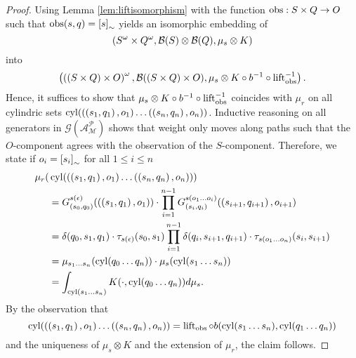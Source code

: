 \begin{proof}
  Using Lemma \ref{lem:liftisomorphism} with the function
  $\operatorname{obs}:S\times Q\rightarrow O$ such that $\operatorname{obs}(s, q) = \left[s\right]_{\sim}$
  yields an isomorphic embedding of
  \begin{equation*}
    \left(S^{\omega}\times Q^{\omega}, 
      \mathcal{B}(S)\otimes\mathcal{B}(Q), \mu_{s}\otimes K\right)
  \end{equation*}
  into 
  \begin{equation*}
    \left(\left(\left(S\times Q\right)\times O\right)^{\omega}, \mathcal{B}(
    \left(S\times Q\right)\times O), \mu_{s}\otimes K\circ b^{-1}\circ\operatorname{lift}_{\operatorname{obs}}^{-1}\right).
  \end{equation*}
  Hence, it suffices to show that
  $\mu_{s}\otimes K\circ b^{-1}\circ\operatorname{lift}_{\operatorname{obs}}^{-1}$ coincides with $\mu_{r}$
  on all cylindric sets $\operatorname{cyl}(\left(\left(s_{1}, q_{1}\right), o_{1}\right)\dots
  \left(\left(s_{n}, q_{n}\right), o_{n}\right))$. Inductive reasoning on all
  generators in $\mathcal{G}(\mathcal{A}_{\mathcal{M}}^{\mathcal{P}})$ shows
  that weight only moves along paths such that the $O$-component agrees with
  the observation of the $S$-component. Therefore, we state if 
  $o_{i} = \left[s_{i}\right]_{\sim}$ for all $1\leq i\leq n$
  \begin{align*}
    \mu_{r}(&\operatorname{cyl}(\left(\left(s_{1}, q_{1}\right), o_{1}\right)
      \dots\left(\left(s_{n}, q_{n}\right), o_{n}\right))) \\
    &= G^{s(\epsilon)}_{\left(s_{0}, q_{0}\right)}(
      \left(\left(s_{1}, q_{1}\right), o_{1}\right))\cdot 
      \prod\limits_{i = 1}^{n-1}G^{s(o_{1}\dots o_{i})}_{\left(s_{i}, q_{i}\right)}(
        \left(s_{i+1}, q_{i+1}\right), o_{i+1})\\
    &= \delta(q_{0}, s_{1}, q_{1})\cdot\tau_{s(\epsilon)}(s_{0}, s_{1})
      \prod\limits_{i = 1}^{n-1}
        \delta(q_{i}, s_{i+1}, q_{i+1})\cdot
        \tau_{s(o_{1}\dots o_{n})}(s_{i}, s_{i+1})\\
    &= \mu_{s_{1}\dots s_{n}}(\operatorname{cyl}(q_{0}\dots q_{n}))\cdot
      \mu_{s}(\operatorname{cyl}(s_{1}\dots s_{n}))\\
    &= \int_{\operatorname{cyl}(s_{1}\dots s_{n})}K(\cdot, \operatorname{cyl}(q_{0}\dots q_{n}))d\mu_{s}.
  \end{align*}
  By the observation that
  \begin{equation*}
    \operatorname{cyl}(\left(\left(s_{1}, q_{1}\right), o_{1}\right)
    \dots\left(\left(s_{n}, q_{n}\right), o_{n}\right)) = 
    \operatorname{lift}_{\operatorname{obs}}\circ b(\operatorname{cyl}(s_{1}\dots s_{n}), \operatorname{cyl}(q_{1}\dots q_{n}))
  \end{equation*}
  and the uniqueness of $\mu_{s}\otimes K$ and the extension of $\mu_{r}$, the
  claim follows.
\end{proof}

